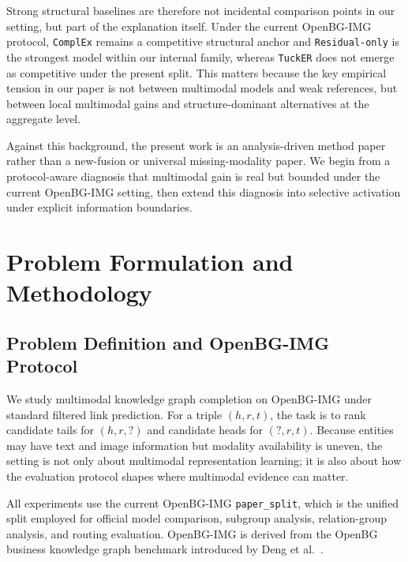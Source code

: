 \documentclass[11pt]{article}
\begin{document}
Strong structural baselines are therefore not incidental comparison points in our setting, but part of the explanation itself. Under the current OpenBG-IMG protocol, \texttt{ComplEx} remains a competitive structural anchor and \texttt{Residual-only} is the strongest model within our internal family, whereas \texttt{TuckER} does not emerge as competitive under the present split. This matters because the key empirical tension in our paper is not between multimodal models and weak references, but between local multimodal gains and structure-dominant alternatives at the aggregate level.

Against this background, the present work is an analysis-driven method paper rather than a new-fusion or universal missing-modality paper. We begin from a protocol-aware diagnosis that multimodal gain is real but bounded under the current OpenBG-IMG setting, then extend this diagnosis into selective activation under explicit information boundaries.

\section{Problem Formulation and Methodology}
\subsection{Problem Definition and OpenBG-IMG Protocol}
We study multimodal knowledge graph completion on OpenBG-IMG under standard filtered link prediction. For a triple $(h, r, t)$, the task is to rank candidate tails for $(h, r, ?)$ and candidate heads for $(?, r, t)$. Because entities may have text and image information but modality availability is uneven, the setting is not only about multimodal representation learning; it is also about how the evaluation protocol shapes where multimodal evidence can matter.

All experiments use the current OpenBG-IMG \texttt{paper\_split}, which is the unified split employed for official model comparison, subgroup analysis, relation-group analysis, and routing evaluation. OpenBG-IMG is derived from the OpenBG business knowledge graph benchmark introduced by Deng et al.~\cite{deng2022openbg}.
\end{document}
